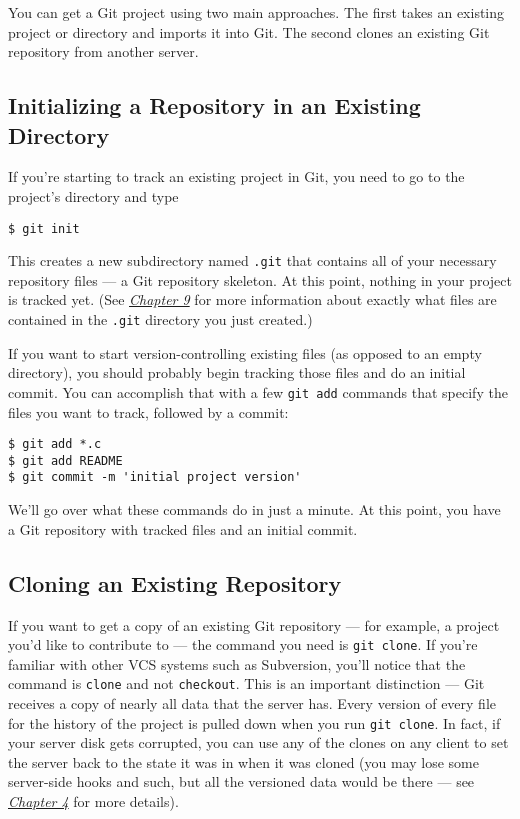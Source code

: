 \documentclass[a4paper]{book}
\newcommand{\prechap}{Chapter }
\newcommand{\postchap}{}
\newcommand{\chapref}[1]{\hyperref[chap:#1]{\prechap #1\postchap}}
\begin{document}
You can get a Git project using two main approaches. The first takes an existing project or directory and imports it into Git. The second clones an existing Git repository from another server.

\subsection{Initializing a Repository in an Existing Directory}\label{initializing-a-repository-in-an-existing-directory}

If you're starting to track an existing project in Git, you need to go to the project's directory and type

\begin{shaded}\begin{verbatim}
$ git init
\end{verbatim}\end{shaded}

This creates a new subdirectory named \texttt{.git} that contains all of your necessary repository files --- a Git repository skeleton. At this point, nothing in your project is tracked yet. (See \emph{\chapref{9}} for more information about exactly what files are contained in the \texttt{.git} directory you just created.)

If you want to start version-controlling existing files (as opposed to an empty directory), you should probably begin tracking those files and do an initial commit. You can accomplish that with a few \texttt{git add} commands that specify the files you want to track, followed by a commit:

\begin{shaded}\begin{verbatim}
$ git add *.c
$ git add README
$ git commit -m 'initial project version'
\end{verbatim}\end{shaded}

We'll go over what these commands do in just a minute. At this point, you have a Git repository with tracked files and an initial commit.

\subsection{Cloning an Existing Repository}\label{cloning-an-existing-repository}

If you want to get a copy of an existing Git repository --- for example, a project you'd like to contribute to --- the command you need is \texttt{git clone}. If you're familiar with other VCS systems such as Subversion, you'll notice that the command is \texttt{clone} and not \texttt{checkout}. This is an important distinction --- Git receives a copy of nearly all data that the server has. Every version of every file for the history of the project is pulled down when you run \texttt{git clone}. In fact, if your server disk gets corrupted, you can use any of the clones on any client to set the server back to the state it was in when it was cloned (you may lose some server-side hooks and such, but all the versioned data would be there --- see \emph{\chapref{4}} for more details).
\end{document}

